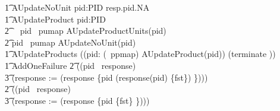 \begin{circus}
        \t1 AUpdateNoUnit \circdef  pid:PID \circspot resp.pid.NA \then \Skip \\
%
        \t1 AUpdateProduct \circdef pid:PID \circspot \\
            \t2 \,\,\,\, \lcircguard pid \in \ran~pumap \rcircguard \circguard AUpdateProductUnits(pid) \\
            \t2 \extchoice \lcircguard pid \notin \ran~pumap \rcircguard \circguard AUpdateNoUnit(pid) \\
%
        \t1 AUpdateProducts \circdef ((\Interleave pid: (\dom~ppmap) \circspot AUpdateProduct(pid)) \circseq (terminate \then \Skip)) \\
%
    \t1 AddOneFailure \circdef
        \t2 (\lcircguard (pid \in \dom~response) \rcircguard \circguard \\
            \t3 (response := (response \oplus \{pid \mapsto (response(pid) \cup \{fst\}) \}))) \circseq \\
        \t2 (\lcircguard (pid \notin \dom~response)  \rcircguard \circguard \\
            \t3 (response := (response \cup \{pid \mapsto \{fst\} \})))\\
%

\end{circus}
